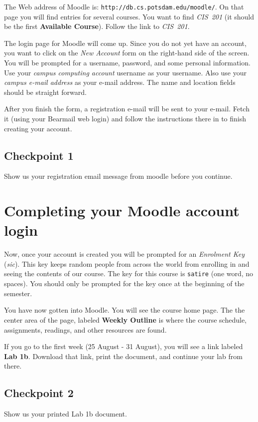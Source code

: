 \documentclass[12pt]{article}
\begin{document}
The Web address of Moodle is:
\texttt{http://db.cs.potsdam.edu/moodle/}. On that page you will find
entries for several courses. You want to find \emph{CIS~201} (it
should be the first \textbf{Available Course}). Follow the link to
\emph{CIS~201}.

The login page for Moodle will come up. Since you do not yet have an
account, you want to click on the \emph{New Account} form on the
right-hand side of the screen. You will be prompted for a username,
password, and some personal information. Use your \emph{campus
  computing account} username as your username. Also use your
\emph{campus e-mail address} as your e-mail address. The name and
location fields should be straight forward. 

After you finish the form, a registration e-mail will be sent to your
e-mail. Fetch it (using your Bearmail web login)
and follow the instructions there in to finish
creating your account.

\subsection*{Checkpoint 1}
Show us your registration email message from moodle before you continue.

\section*{Completing your Moodle account login}

Now, once your account is created you will be prompted for an
\emph{Enrolment Key} (\emph{sic}). This key keeps random people from
across the world from enrolling in and seeing the contents of our
course. The key for this course is \texttt{satire} (one word, no
spaces). You should only be prompted for the key once at the beginning
of the semester.

You have now gotten into Moodle. You will see the course home
page. The the center area of the page, labeled \textbf{Weekly
  Outline} is where the course schedule,  assignments, 
readings, and other resources are found.

If you go to the first week (25 August - 31 August), you will see a
link labeled \textbf{Lab 1b}. Download that link, print the document,
and continue your lab from there.

\subsection*{Checkpoint 2}
Show us your printed Lab 1b document.
\end{document}
